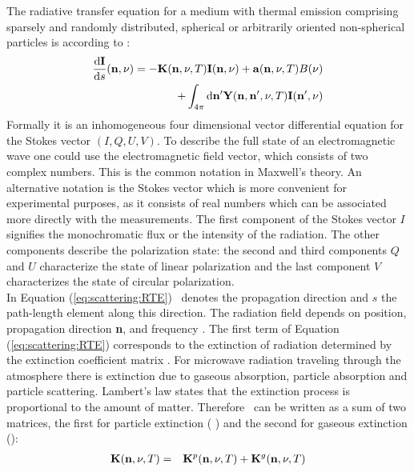 \newcommand{\DirFre} {(\PDir, \Frq, \Tmp)}
\newcommand{\DirFrePr} {\ensuremath{(\PDir, \PDir^\prime, \Frq, \Tmp)}}


\label{sec:scattering:general_rte}
 
The radiative transfer equation for a medium with thermal emission
comprising sparsely and randomly distributed, spherical or arbitrarily
oriented non-spherical particles is according to \cite{sree02}:
\begin{eqnarray}
\label{eq:scattering:RTE} 
     \frac{\DiffD \StoVec}{\DiffD s}(\PDir, \Frq) =
     -\ExtMat\DirFre\StoVec(\PDir, \Frq)+\AbsVec\DirFre
     \Planck(\Frq) \\ \nonumber
     +\int_{4\pi} \DiffD \PDir^\prime \SEfMat\DirFrePr
     \StoVec(\PDir^\prime, \Frq) 
\end{eqnarray} 
Formally it is an inhomogeneous four dimensional vector differential
equation for the Stokes vector \StoVec $(I,Q,U,V)$. To describe the
full state of an electromagnetic wave one could use the
electromagnetic field vector, which consists of two complex numbers.
This is the common notation in Maxwell's theory. An alternative
notation is the Stokes vector which is more convenient for
experimental purposes, as it consists of real numbers which can be
associated more directly with the measurements.  The first component
of the Stokes vector $I$ signifies the monochromatic flux or the
intensity of the radiation. The other components describe the
polarization state: the second and third components $Q$ and $U$
characterize the state of linear polarization and the last component $V$
characterizes the state of circular polarization.\\
In Equation (\ref{eq:scattering:RTE}) \PDir\ denotes the propagation
direction and \DiffD $s$ the path-length element along this direction.
The radiation field depends on position, propagation direction {\bf
  n}, and frequency \Frq.  \vspace{1ex} The first term of Equation
(\ref{eq:scattering:RTE}) corresponds to the extinction of radiation
determined by the extinction coefficient matrix \ExtMat . For
microwave radiation traveling through the atmosphere there is
extinction due to gaseous absorption, particle absorption and particle
scattering. Lambert's law states that the extinction process is
proportional to the amount of matter. Therefore \ExtMat\ can be
written as a sum of two matrices, the first for particle extinction (
) and the second for gaseous extinction ():
\begin{eqnarray}
  \ExtMat\DirFre &=&
  \aExtMat{p}\DirFre+\aExtMat{g}\DirFre
\end{eqnarray}

